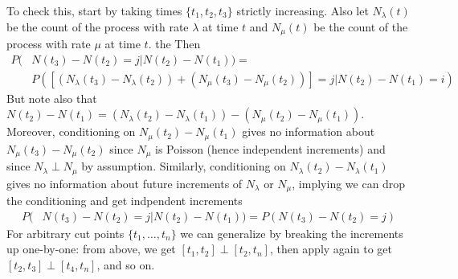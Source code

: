 \documentclass[12pt]{article}
\theoremstyle{plain}
\theoremstyle{definition}
\theoremstyle{remark}
\begin{document}
\begin{enumerate}
\begin{enumerate}
        To check this, start by taking times $\{t_1,t_2,t_3\}$ strictly
        increasing. Also let $N_\lambda(t)$ be the count of the process
        with rate $\lambda$ at time $t$ and $N_\mu(t)$ be the count of
        the process with rate $\mu$ at time $t$.
        the Then
        \begin{align*}
          P(&N(t_3)-N(t_2)=j | N(t_2)-N(t_1)) =\\
            & P(\left[\left(N_\lambda(t_3)-N_\lambda(t_2)\right)+
              \left(N_\mu(t_3) - N_\mu(t_2)\right)\right]=j
                | N(t_2)-N(t_1)=i) 
        \end{align*}
        But note also that
        $N(t_2)-N(t_1)=(N_\lambda(t_2)-N_\lambda(t_1))-
        (N_\mu(t_2)-N_\mu(t_1))$. Moreover, conditioning on
        $N_\mu(t_2)-N_\mu(t_1)$ gives no information about
        $N_\mu(t_3)-N_\mu(t_2)$  since $N_\mu$ is Poisson (hence
        independent increments) and since $N_\lambda \perp N_\mu$ by
        assumption. Similarly, conditioning on
        $N_\lambda(t_2)-N_\lambda(t_1)$ gives no information about
        future increments of $N_\lambda$ or $N_\mu$, implying we can
        drop the conditioning and get indpendent increments
        \begin{align*}
          P(&N(t_3)-N(t_2)=j | N(t_2)-N(t_1))=
          P(N(t_3)-N(t_2)=j )
        \end{align*}
        For arbitrary cut points $\{t_1,\ldots,t_n\}$ we can generalize
        by breaking the increments up one-by-one: from above, we get
        $[t_1,t_2]\perp[t_2,t_n]$, then apply again to get
        $[t_2,t_3]\perp[t_4,t_n]$, and so on.


\end{enumerate}
\end{enumerate}
\end{document}
